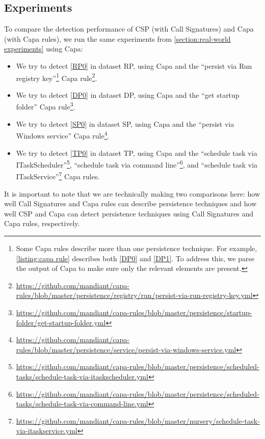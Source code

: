 \subsection{Experiments}
To compare the detection performance of CSP (with Call Signatures) and Capa (with Capa rules), we run the same experiments from \autoref{section:real-world experiments} using Capa:

\begin{itemize}
  \item We try to detect \autoref{RP0} in dataset RP, using Capa and the ``persist via Run registry key''\footnote{Some Capa rules describe more than one persistence technique. For example, \autoref{listing:capa rule} describes both \autoref{DP0} and \autoref{DP1}. To address this, we parse the output of Capa to make sure only the relevant elements are present.} Capa rule\footnote{\tiny \url{https://github.com/mandiant/capa-rules/blob/master/persistence/registry/run/persist-via-run-registry-key.yml}}.

  \item We try to detect \autoref{DP0} in dataset DP, using Capa and the ``get startup folder'' Capa rule\footnote{\tiny \url{https://github.com/mandiant/capa-rules/blob/master/persistence/startup-folder/get-startup-folder.yml}}.

  \item We try to detect \autoref{SP0} in dataset SP, using Capa and the ``persist via Windows service'' Capa rule\footnote{\tiny \url{https://github.com/mandiant/capa-rules/blob/master/persistence/service/persist-via-windows-service.yml}}.

  \item We try to detect \autoref{TP0} in dataset TP, using Capa and the ``schedule task via ITaskScheduler''\footnote{\tiny \url{https://github.com/mandiant/capa-rules/blob/master/persistence/scheduled-tasks/schedule-task-via-itaskscheduler.yml}}, ``schedule task via command line''\footnote{\tiny \url{https://github.com/mandiant/capa-rules/blob/master/persistence/scheduled-tasks/schedule-task-via-command-line.yml}}, and ``schedule task via ITaskService''\footnote{\tiny \url{https://github.com/mandiant/capa-rules/blob/master/nursery/schedule-task-via-itaskservice.yml}} Capa rules.
\end{itemize}

It is important to note that we are technically making two comparisons here: how well Call Signatures and Capa rules can describe persistence techniques and how well CSP and Capa can detect persistence techniques using Call Signatures and Capa rules, respectively.

